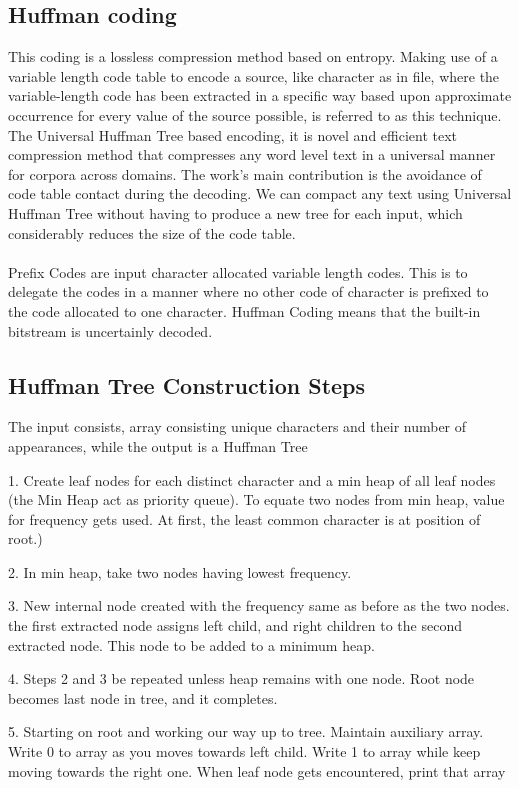 \documentclass[a4paper, 12pt]{article}
\begin{document}
\subsection{Huffman coding }
\par
\hspace{1cm}This coding is a lossless compression method based on entropy. Making use of a 
variable length code table to encode a source, like character as in file, where the 
variable-length code has been extracted in a specific way based upon 
approximate occurrence for every value of the source possible, is referred to as this 
technique. The Universal Huffman Tree based encoding, it is novel and efficient text 
compression method that compresses any word level text in a universal manner for 
corpora across domains. The work's main contribution is the avoidance of code table 
contact during the decoding. We can compact any text using Universal Huffman Tree 
without having to produce a new tree for each input, which considerably reduces the size 
of the code table.\\
\\Prefix Codes are input character allocated variable length codes. This is to 
delegate the codes in a manner where no other code of character is prefixed to the code 
allocated to one character. Huffman Coding means that the built-in bitstream is 
uncertainly decoded.
\\

\subsection{Huffman Tree Construction Steps}
\par
\hspace{1cm}
The input consists, array consisting unique characters and their number of 
appearances, while the output is a Huffman Tree
\\
\par 1. Create leaf nodes for each distinct character and a min heap of all leaf nodes (the 
Min Heap act as priority queue). To equate two nodes from min heap, value for 
frequency gets used. At first, the least common character is at position of root.)
\par
2. In min heap, take two nodes having lowest frequency.
\par 3. New internal node created with the frequency same as before as the two nodes. the 
first extracted node assigns left child, and right children to the second extracted 
node. This node to be added to a minimum heap.
\par 4. Steps 2 and 3 be repeated unless heap remains with one node. Root node becomes
last node in tree, and it completes.
\par 5. Starting on root and working our way up to tree. Maintain auxiliary array. Write 0 
to array as you moves towards left child. Write 1 to array while keep moving 
towards the right one. When leaf node gets encountered, print that array
\\
\end{document}
